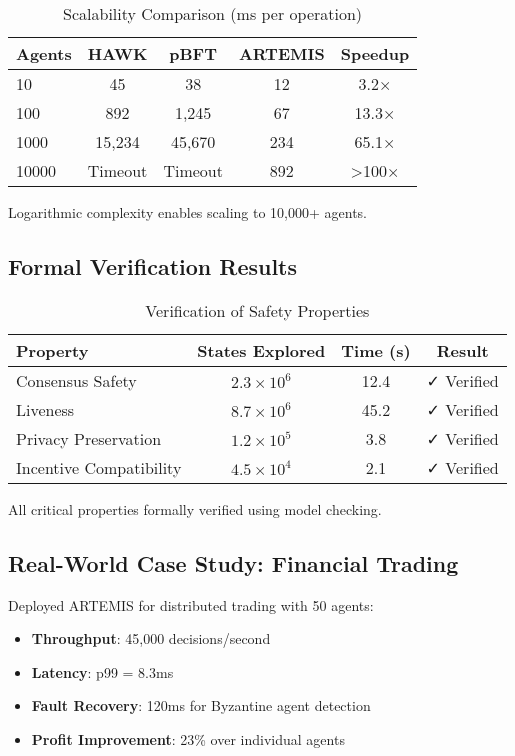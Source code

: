 \documentclass[conference]{IEEEtran}
\begin{document}
\begin{table}[htbp]
\centering
\caption{Scalability Comparison (ms per operation)}
\label{tab:scalability}
\begin{tabular}{@{}lcccc@{}}
\toprule
\textbf{Agents} & \textbf{HAWK} & \textbf{pBFT} & \textbf{ARTEMIS} & \textbf{Speedup} \\
\midrule
10 & 45 & 38 & 12 & 3.2× \\
100 & 892 & 1,245 & 67 & 13.3× \\
1000 & 15,234 & 45,670 & 234 & 65.1× \\
10000 & Timeout & Timeout & 892 & >100× \\
\bottomrule
\end{tabular}
\end{table}

Logarithmic complexity enables scaling to 10,000+ agents.

\subsection{Formal Verification Results}

\begin{table}[htbp]
\centering
\caption{Verification of Safety Properties}
\label{tab:verification}
\begin{tabular}{@{}lccc@{}}
\toprule
\textbf{Property} & \textbf{States Explored} & \textbf{Time (s)} & \textbf{Result} \\
\midrule
Consensus Safety & $2.3 \times 10^6$ & 12.4 & ✓ Verified \\
Liveness & $8.7 \times 10^6$ & 45.2 & ✓ Verified \\
Privacy Preservation & $1.2 \times 10^5$ & 3.8 & ✓ Verified \\
Incentive Compatibility & $4.5 \times 10^4$ & 2.1 & ✓ Verified \\
\bottomrule
\end{tabular}
\end{table}

All critical properties formally verified using model checking.

\subsection{Real-World Case Study: Financial Trading}

Deployed ARTEMIS for distributed trading with 50 agents:
\begin{itemize}
    \item \textbf{Throughput}: 45,000 decisions/second
    \item \textbf{Latency}: p99 = 8.3ms
    \item \textbf{Fault Recovery}: 120ms for Byzantine agent detection
    \item \textbf{Profit Improvement}: 23\% over individual agents
\end{itemize}
\end{document}

